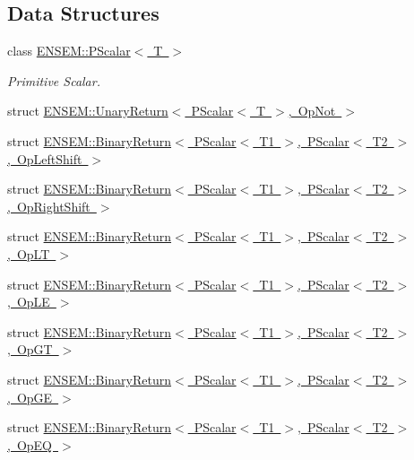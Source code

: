 \subsection*{Data Structures}
\begin{DoxyCompactItemize}
\item 
class \mbox{\hyperlink{classENSEM_1_1PScalar}{E\+N\+S\+E\+M\+::\+P\+Scalar$<$ T $>$}}
\begin{DoxyCompactList}\small\item\em Primitive Scalar. \end{DoxyCompactList}\item 
struct \mbox{\hyperlink{structENSEM_1_1UnaryReturn_3_01PScalar_3_01T_01_4_00_01OpNot_01_4}{E\+N\+S\+E\+M\+::\+Unary\+Return$<$ P\+Scalar$<$ T $>$, Op\+Not $>$}}
\item 
struct \mbox{\hyperlink{structENSEM_1_1BinaryReturn_3_01PScalar_3_01T1_01_4_00_01PScalar_3_01T2_01_4_00_01OpLeftShift_01_4}{E\+N\+S\+E\+M\+::\+Binary\+Return$<$ P\+Scalar$<$ T1 $>$, P\+Scalar$<$ T2 $>$, Op\+Left\+Shift $>$}}
\item 
struct \mbox{\hyperlink{structENSEM_1_1BinaryReturn_3_01PScalar_3_01T1_01_4_00_01PScalar_3_01T2_01_4_00_01OpRightShift_01_4}{E\+N\+S\+E\+M\+::\+Binary\+Return$<$ P\+Scalar$<$ T1 $>$, P\+Scalar$<$ T2 $>$, Op\+Right\+Shift $>$}}
\item 
struct \mbox{\hyperlink{structENSEM_1_1BinaryReturn_3_01PScalar_3_01T1_01_4_00_01PScalar_3_01T2_01_4_00_01OpLT_01_4}{E\+N\+S\+E\+M\+::\+Binary\+Return$<$ P\+Scalar$<$ T1 $>$, P\+Scalar$<$ T2 $>$, Op\+L\+T $>$}}
\item 
struct \mbox{\hyperlink{structENSEM_1_1BinaryReturn_3_01PScalar_3_01T1_01_4_00_01PScalar_3_01T2_01_4_00_01OpLE_01_4}{E\+N\+S\+E\+M\+::\+Binary\+Return$<$ P\+Scalar$<$ T1 $>$, P\+Scalar$<$ T2 $>$, Op\+L\+E $>$}}
\item 
struct \mbox{\hyperlink{structENSEM_1_1BinaryReturn_3_01PScalar_3_01T1_01_4_00_01PScalar_3_01T2_01_4_00_01OpGT_01_4}{E\+N\+S\+E\+M\+::\+Binary\+Return$<$ P\+Scalar$<$ T1 $>$, P\+Scalar$<$ T2 $>$, Op\+G\+T $>$}}
\item 
struct \mbox{\hyperlink{structENSEM_1_1BinaryReturn_3_01PScalar_3_01T1_01_4_00_01PScalar_3_01T2_01_4_00_01OpGE_01_4}{E\+N\+S\+E\+M\+::\+Binary\+Return$<$ P\+Scalar$<$ T1 $>$, P\+Scalar$<$ T2 $>$, Op\+G\+E $>$}}
\item 
struct \mbox{\hyperlink{structENSEM_1_1BinaryReturn_3_01PScalar_3_01T1_01_4_00_01PScalar_3_01T2_01_4_00_01OpEQ_01_4}{E\+N\+S\+E\+M\+::\+Binary\+Return$<$ P\+Scalar$<$ T1 $>$, P\+Scalar$<$ T2 $>$, Op\+E\+Q $>$}}

\end{DoxyCompactItemize}
